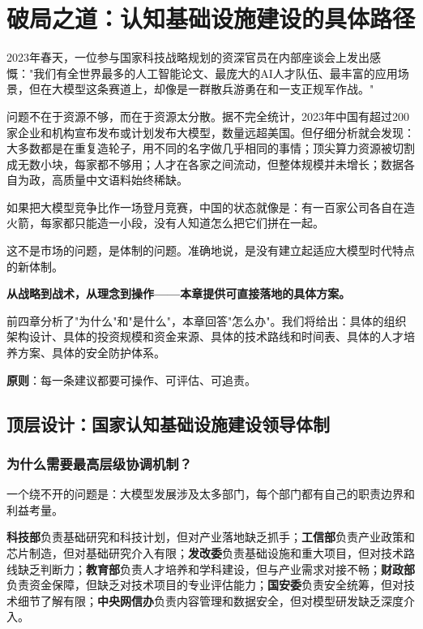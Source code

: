 \chapter{破局之道：认知基础设施建设的具体路径}

2023年春天，一位参与国家科技战略规划的资深官员在内部座谈会上发出感慨："我们有全世界最多的人工智能论文、最庞大的AI人才队伍、最丰富的应用场景，但在大模型这条赛道上，却像是一群散兵游勇在和一支正规军作战。"

问题不在于资源不够，而在于资源太分散。据不完全统计，2023年中国有超过200家企业和机构宣布发布或计划发布大模型，数量远超美国。但仔细分析就会发现：大多数都是在重复造轮子，用不同的名字做几乎相同的事情；顶尖算力资源被切割成无数小块，每家都不够用；人才在各家之间流动，但整体规模并未增长；数据各自为政，高质量中文语料始终稀缺。

如果把大模型竞争比作一场登月竞赛，中国的状态就像是：有一百家公司各自在造火箭，每家都只能造一小段，没有人知道怎么把它们拼在一起。

这不是市场的问题，是体制的问题。准确地说，是没有建立起适应大模型时代特点的新体制。

\textbf{从战略到战术，从理念到操作——本章提供可直接落地的具体方案。}

前四章分析了"为什么"和"是什么"，本章回答"怎么办"。我们将给出：具体的组织架构设计、具体的投资规模和资金来源、具体的技术路线和时间表、具体的人才培养方案、具体的安全防护体系。

\textbf{原则}：每一条建议都要可操作、可评估、可追责。

\section{顶层设计：国家认知基础设施建设领导体制}

\subsection{为什么需要最高层级协调机制？}

一个绕不开的问题是：大模型发展涉及太多部门，每个部门都有自己的职责边界和利益考量。

\textbf{科技部}负责基础研究和科技计划，但对产业落地缺乏抓手；\textbf{工信部}负责产业政策和芯片制造，但对基础研究介入有限；\textbf{发改委}负责基础设施和重大项目，但对技术路线缺乏判断力；\textbf{教育部}负责人才培养和学科建设，但与产业需求对接不畅；\textbf{财政部}负责资金保障，但缺乏对技术项目的专业评估能力；\textbf{国安委}负责安全统筹，但对技术细节了解有限；\textbf{中央网信办}负责内容管理和数据安全，但对模型研发缺乏深度介入。

